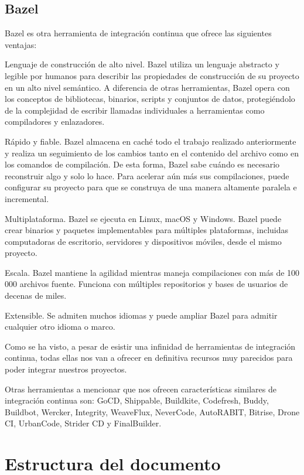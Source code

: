\subsection{Bazel}
Bazel es otra herramienta de integración continua que ofrece las siguientes ventajas:
\begin{compactitem}
    \item Lenguaje de construcción de alto nivel. Bazel utiliza un lenguaje abstracto y legible por humanos para describir las propiedades de construcción de su proyecto en un alto nivel semántico. A diferencia de otras herramientas, Bazel opera con los conceptos de bibliotecas, binarios, scripts y conjuntos de datos, protegiéndolo de la complejidad de escribir llamadas individuales a herramientas como compiladores y enlazadores.
    \item Rápido y fiable. Bazel almacena en caché todo el trabajo realizado anteriormente y realiza un seguimiento de los cambios tanto en el contenido del archivo como en los comandos de compilación. De esta forma, Bazel sabe cuándo es necesario reconstruir algo y solo lo hace. Para acelerar aún más sus compilaciones, puede configurar su proyecto para que se construya de una manera altamente paralela e incremental.
    \item Multiplataforma. Bazel se ejecuta en Linux, macOS y Windows. Bazel puede crear binarios y paquetes implementables para múltiples plataformas, incluidas computadoras de escritorio, servidores y dispositivos móviles, desde el mismo proyecto.
    \item Escala. Bazel mantiene la agilidad mientras maneja compilaciones con más de 100 000 archivos fuente. Funciona con múltiples repositorios y bases de usuarios de decenas de miles.
    \item Extensible. Se admiten muchos idiomas y puede ampliar Bazel para admitir cualquier otro idioma o marco.
\end{compactitem}

Como se ha visto, a pesar de esistir una infinidad de herramientas de integración continua, todas ellas nos van a ofrecer en definitiva recursos muy parecidos para poder integrar nuestros proyectos.

Otras herramientas a mencionar que nos ofrecen características similares de integración continua son: GoCD, Shippable, Buildkite, Codefresh, Buddy, Buildbot, Wercker, Integrity, WeaveFlux, NeverCode, AutoRABIT, Bitrise, Drone CI, UrbanCode, Strider CD y FinalBuilder.

\section{Estructura del documento}

